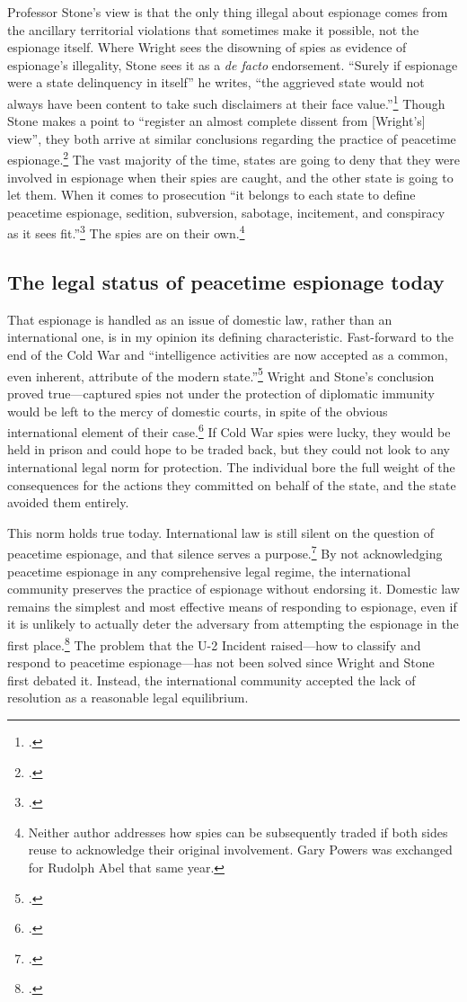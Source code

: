 \documentclass[12pt]{article}
\begin{document}
Professor Stone's view is that the only thing illegal about espionage comes from the ancillary territorial violations that sometimes make it possible, not the espionage itself. Where Wright sees the disowning of spies as evidence of espionage's illegality, Stone sees it as a \emph{de facto} endorsement. ``Surely if espionage were a state delinquency in itself'' he writes, ``the aggrieved state would not always have been content to take such disclaimers at their face value.''\footcite[p.~33]{stone_legal_1962} Though Stone makes a point to ``register an almost complete dissent from [Wright's] view'', they both arrive at similar conclusions regarding the practice of peacetime espionage.\footcite[p.~33]{stone_legal_1962} The vast majority of the time, states are going to deny that they were involved in espionage when their spies are caught, and the other state is going to let them. When it comes to prosecution ``it belongs to each state to define peacetime espionage, sedition, subversion, sabotage, incitement, and conspiracy as it sees fit.''\footcite[p.~4]{wright_espionage_1962} The spies are on their own.\footnote{Neither author addresses how spies can be subsequently traded if both sides reuse to acknowledge their original involvement. Gary Powers was exchanged for Rudolph Abel that same year.}

\subsection{The legal status of peacetime espionage today}
That espionage is handled as an issue of domestic law, rather than an international one, is in my opinion its defining characteristic. Fast-forward to the end of the Cold War and ``intelligence activities are now accepted as a common, even inherent, attribute of the modern state.''\footcite[p.~321]{demarest_espionage_1995} Wright and Stone's conclusion proved true---captured spies not under the protection of diplomatic immunity would be left to the mercy of domestic courts, in spite of the obvious international element of their case.\footcite[p.~330]{demarest_espionage_1995} If Cold War spies were lucky, they would be held in prison and could hope to be traded back, but they could not look to any international legal norm for protection.  The individual bore the full weight of the consequences for the actions they committed on behalf of the state, and the state avoided them entirely.

This norm holds true today. International law is still silent on the question of peacetime espionage, and that silence serves a purpose.\footcite[p.~653]{beim_enforcing_2018} By not acknowledging peacetime espionage in any comprehensive legal regime, the international community preserves the practice of espionage without endorsing it. Domestic law remains the simplest and most effective means of responding to espionage, even if it is unlikely to actually deter the adversary from attempting the espionage in the first place.\footcite[p.~657]{beim_enforcing_2018} The problem that the U-2 Incident raised---how to classify and respond to peacetime espionage---has not been solved since Wright and Stone first debated it. Instead, the international community accepted the lack of resolution as a reasonable legal equilibrium.
\end{document}
